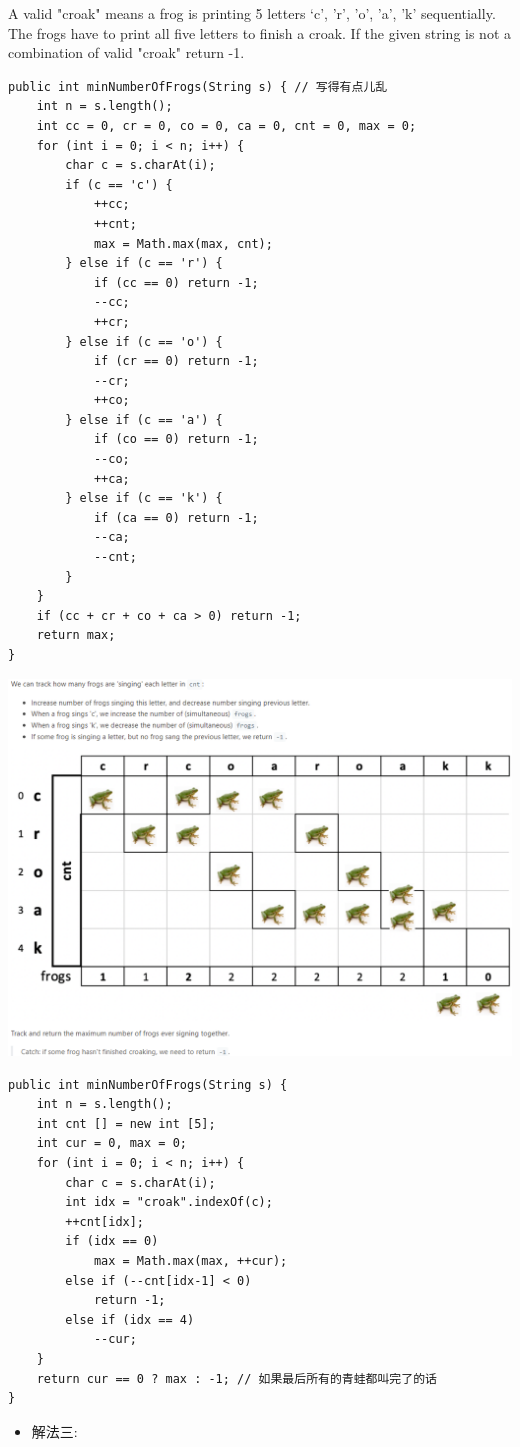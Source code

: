\documentclass[9pt, b5paaper]{book}
\begin{document}
A valid "croak" means a frog is printing 5 letters ‘c’, ’r’, ’o’, ’a’, ’k’ sequentially. The frogs have to print all five letters to finish a croak. If the given string is not a combination of valid "croak" return -1.
\begin{verbatim}
public int minNumberOfFrogs(String s) { // 写得有点儿乱
    int n = s.length();
    int cc = 0, cr = 0, co = 0, ca = 0, cnt = 0, max = 0;
    for (int i = 0; i < n; i++) {
        char c = s.charAt(i);
        if (c == 'c') {
            ++cc;
            ++cnt;
            max = Math.max(max, cnt);
        } else if (c == 'r') {
            if (cc == 0) return -1;
            --cc;
            ++cr;
        } else if (c == 'o') {
            if (cr == 0) return -1;
            --cr;
            ++co;
        } else if (c == 'a') {
            if (co == 0) return -1;
            --co;
            ++ca;
        } else if (c == 'k') {
            if (ca == 0) return -1;
            --ca;
            --cnt;
        }
    }
    if (cc + cr + co + ca > 0) return -1;
    return max;
}
\end{verbatim}

\includegraphics[width=.9\linewidth]{./pic/frogs.png}
\begin{verbatim}
public int minNumberOfFrogs(String s) {
    int n = s.length();
    int cnt [] = new int [5];
    int cur = 0, max = 0;
    for (int i = 0; i < n; i++) {
        char c = s.charAt(i);
        int idx = "croak".indexOf(c);
        ++cnt[idx];
        if (idx == 0)
            max = Math.max(max, ++cur);
        else if (--cnt[idx-1] < 0)
            return -1;
        else if (idx == 4)
            --cur;
    }
    return cur == 0 ? max : -1; // 如果最后所有的青蛙都叫完了的话  
}
\end{verbatim}
\begin{itemize}
\item 解法三:
\end{itemize}
\end{document}

